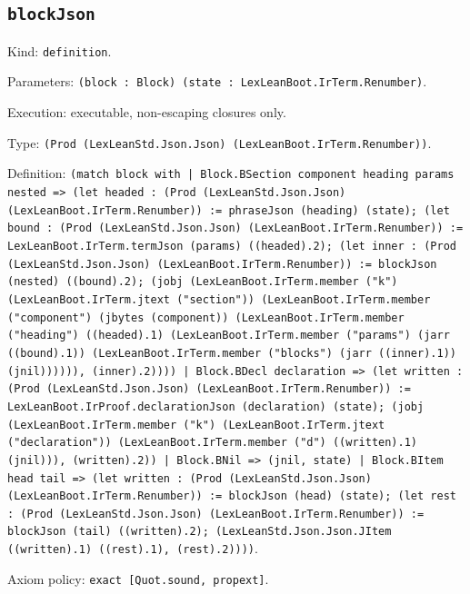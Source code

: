 \documentclass[11pt]{article}
\begin{document}
\subsection*{\texttt{blockJson}}
\noindent Kind: \texttt{definition}.\par
\noindent Parameters: \texttt{(block : Block) (state : LexLeanBoot.IrTerm.Renumber)}.\par
\noindent Execution: executable, non-escaping closures only.\par
\noindent Type: \texttt{(Prod (LexLeanStd.Json.Json) (LexLeanBoot.IrTerm.Renumber))}.\par
\noindent Definition: \texttt{(match block with | Block.BSection component heading params nested => (let headed : (Prod (LexLeanStd.Json.Json) (LexLeanBoot.IrTerm.Renumber)) := phraseJson (heading) (state); (let bound : (Prod (LexLeanStd.Json.Json) (LexLeanBoot.IrTerm.Renumber)) := LexLeanBoot.IrTerm.termJson (params) ((headed).2); (let inner : (Prod (LexLeanStd.Json.Json) (LexLeanBoot.IrTerm.Renumber)) := blockJson (nested) ((bound).2); (jobj (LexLeanBoot.IrTerm.member ("k") (LexLeanBoot.IrTerm.jtext ("section")) (LexLeanBoot.IrTerm.member ("component") (jbytes (component)) (LexLeanBoot.IrTerm.member ("heading") ((headed).1) (LexLeanBoot.IrTerm.member ("params") (jarr ((bound).1)) (LexLeanBoot.IrTerm.member ("blocks") (jarr ((inner).1)) (jnil)))))), (inner).2)))) | Block.BDecl declaration => (let written : (Prod (LexLeanStd.Json.Json) (LexLeanBoot.IrTerm.Renumber)) := LexLeanBoot.IrProof.declarationJson (declaration) (state); (jobj (LexLeanBoot.IrTerm.member ("k") (LexLeanBoot.IrTerm.jtext ("declaration")) (LexLeanBoot.IrTerm.member ("d") ((written).1) (jnil))), (written).2)) | Block.BNil => (jnil, state) | Block.BItem head tail => (let written : (Prod (LexLeanStd.Json.Json) (LexLeanBoot.IrTerm.Renumber)) := blockJson (head) (state); (let rest : (Prod (LexLeanStd.Json.Json) (LexLeanBoot.IrTerm.Renumber)) := blockJson (tail) ((written).2); (LexLeanStd.Json.Json.JItem ((written).1) ((rest).1), (rest).2))))}.\par
\noindent Axiom policy: \texttt{exact [Quot.sound, propext]}.\par
\end{document}
